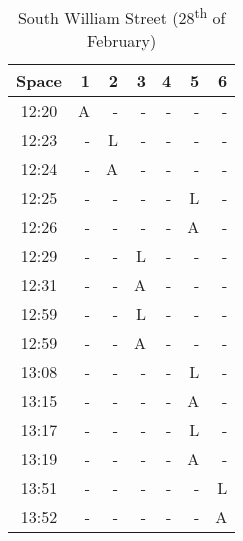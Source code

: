 \begin{table}[H]
\begin{minipage}{0.48\textwidth}
        \end{minipage}%
        \hfill
        \begin{minipage}{0.48\textwidth}
        \centering
        \begin{tabular}{|c|r|r|r|r|r|r|}
            \hline
            Space & 1 & 2 & 3 & 4 & 5 & 6 \\
            \hline\hline
            12:20 & A & - & - & - & - & - \\ \hline
            12:23 & - & L & - & - & - & - \\ \hline
            12:24 & - & A & - & - & - & - \\ \hline
            12:25 & - & - & - & - & L & - \\ \hline
            12:26 & - & - & - & - & A & - \\ \hline
            12:29 & - & - & L & - & - & - \\ \hline
            12:31 & - & - & A & - & - & - \\ \hline
            12:59 & - & - & L & - & - & - \\ \hline
            12:59 & - & - & A & - & - & - \\ \hline
            13:08 & - & - & - & - & L & - \\ \hline
            13:15 & - & - & - & - & A & - \\ \hline
            13:17 & - & - & - & - & L & - \\ \hline
            13:19 & - & - & - & - & A & - \\ \hline
            13:51 & - & - & - & - & - & L \\ \hline
            13:52 & - & - & - & - & - & A \\
            \hline
    \end{tabular}
    \caption{South William Street (28\textsuperscript{th} of February)}
    \label{table:southWilliamStreet} 
    \end{minipage}
\end{table}